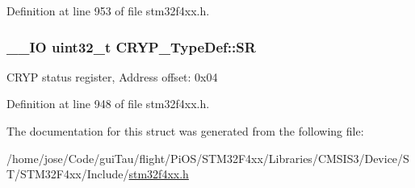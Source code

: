 Definition at line 953 of file stm32f4xx.\-h.

\hypertarget{struct_c_r_y_p___type_def_a1d5cabaf9aea97e1b6f08352bc249094}{
\subsubsection[{S\-R}]{\setlength{\rightskip}{0pt plus 5cm}\-\_\-\-\_\-\-I\-O {\bf uint32\-\_\-t} C\-R\-Y\-P\-\_\-\-Type\-Def\-::\-S\-R}}\label{struct_c_r_y_p___type_def_a1d5cabaf9aea97e1b6f08352bc249094}
C\-R\-Y\-P status register, Address offset\-: 0x04 

Definition at line 948 of file stm32f4xx.\-h.



The documentation for this struct was generated from the following file\-:\begin{DoxyCompactItemize}
\item 
/home/jose/\-Code/gui\-Tau/flight/\-Pi\-O\-S/\-S\-T\-M32\-F4xx/\-Libraries/\-C\-M\-S\-I\-S3/\-Device/\-S\-T/\-S\-T\-M32\-F4xx/\-Include/\hyperlink{stm32f4xx_8h}{stm32f4xx.\-h}\end{DoxyCompactItemize}
